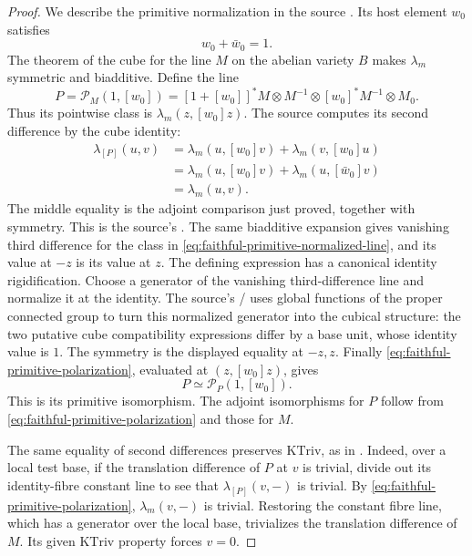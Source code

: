 \begin{proof}
We describe the primitive normalization in the source
.
Its host element \(w_0\) satisfies
\[
                            w_0+\bar w_0=1.
\]
The theorem of the cube for the line \(M\) on the abelian
variety \(B\) makes \(\lambda_m\) symmetric and biadditive.
Define the line
\[
       P=\mathcal P_M(1,[w_0])
        =[1+[w_0]]^*M\otimes M^{-1}
                         \otimes[w_0]^*M^{-1}\otimes M_0 .
 \tag{AQ3}\label{eq:faithful-primitive-normalized-line}
\]
Thus its pointwise class is \(\lambda_m(z,[w_0]z)\).
The source computes its second difference by the cube identity:
\[
 \begin{split}
 \lambda_{[P]}(u,v)
   &=\lambda_m(u,[w_0]v)+\lambda_m(v,[w_0]u)\\
   &=\lambda_m(u,[w_0]v)+\lambda_m(u,[\bar w_0]v)\\
   &=\lambda_m(u,v).
 \end{split}
 \tag{AQ4}\label{eq:faithful-primitive-polarization}
\]
The middle equality is the adjoint comparison just proved,
together with symmetry.
This is the source's .
The same biadditive expansion gives vanishing third difference
for the class in \eqref{eq:faithful-primitive-normalized-line},
and its value at \(-z\) is its value at \(z\).
The defining expression has a canonical identity rigidification.
Choose a generator of the vanishing third-difference line and
normalize it at the identity.
The source's
/
uses global functions of the proper connected group to turn
this normalized generator into the cubical structure:
the two putative cube compatibility expressions differ by a
base unit, whose identity value is \(1\).
The symmetry is the displayed equality at \(-z,z\).
Finally \eqref{eq:faithful-primitive-polarization}, evaluated at
\((z,[w_0]z)\), gives
\[
                              P\simeq\mathcal P_P(1,[w_0]).
\]
This is its primitive isomorphism.
The adjoint isomorphisms for \(P\) follow from
\eqref{eq:faithful-primitive-polarization} and those for \(M\).

The same equality of second differences preserves
\(\mathrm{KTriv}\), as in .
Indeed, over a local test base, if the translation difference
of \(P\) at \(v\) is trivial, divide out its identity-fibre
constant line to see that \(\lambda_{[P]}(v,-)\) is trivial.
By \eqref{eq:faithful-primitive-polarization},
\(\lambda_m(v,-)\) is trivial.  Restoring the constant fibre
line, which has a generator over the local base, trivializes
the translation difference of \(M\).  Its given
\(\mathrm{KTriv}\) property forces \(v=0\).


\end{proof}
